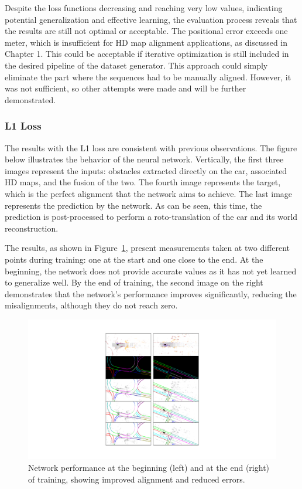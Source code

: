 Despite the loss functions decreasing and reaching very low values, indicating potential generalization and effective learning, the evaluation process reveals that the results are still not optimal or acceptable. The positional error exceeds one meter, which is insufficient for HD map alignment applications, as discussed in Chapter 1. This could be acceptable if iterative optimization is still included in the desired pipeline of the dataset generator. This approach could simply eliminate the part where the sequences had to be manually aligned. However, it was not sufficient, so other attempts were made and will be further demonstrated. 

\subsubsection*{L1 Loss}
The results with the L1 loss are consistent with previous observations. 
The figure below illustrates the behavior of the neural network. Vertically, the first three images represent the inputs: obstacles extracted directly on the car, associated HD maps, and the fusion of the two. The fourth image represents the target, which is the perfect alignment that the network aims to achieve. The last image represents the prediction by the network. As can be seen, this time, the prediction is post-processed to perform a roto-translation of the car and its world reconstruction.

The results, as shown in Figure~\ref{fig:network-training-results1}, present measurements taken at two different points during training: one at the start and one close to the end. At the beginning, the network does not provide accurate values as it has not yet learned to generalize well. By the end of training, the second image on the right demonstrates that the network's performance improves significantly, reducing the misalignments, although they do not reach zero.
\begin{figure}[H]
    \centering
    \includegraphics[width=1\linewidth]{LateX//figs/IMMAGINI_L1_rete.pdf}
    \caption{Network performance at the beginning (left) and at the end (right) of training, showing improved alignment and reduced errors.}
    \label{fig:network-training-results1}
\end{figure}

